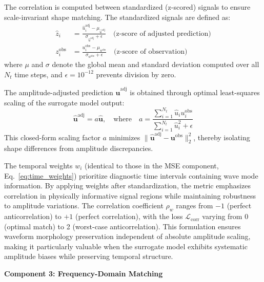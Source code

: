 \documentclass[12pt,a4paper]{report}
\begin{document}
The correlation is computed between standardized (z-scored) signals to ensure scale-invariant shape matching. The standardized signals are defined as:
\begin{align}
\hat{z}_i &= \frac{\hat{u}_i^{\text{adj}} - \mu_{\hat{u}^{\text{adj}}}}{\sigma_{\hat{u}^{\text{adj}}} + \epsilon} \quad \text{(z-score of adjusted prediction)} \\
z_i^{\text{obs}} &= \frac{u_i^{\text{obs}} - \mu_{u^{\text{obs}}}}{\sigma_{u^{\text{obs}}} + \epsilon} \quad \text{(z-score of observation)}
\end{align}
where $\mu$ and $\sigma$ denote the global mean and standard deviation computed over all $N_t$ time steps, and $\epsilon = 10^{-12}$ prevents division by zero.

The amplitude-adjusted prediction $\hat{\mathbf{u}}^{\text{adj}}$ is obtained through optimal least-squares scaling of the surrogate model output:
\begin{equation}
\hat{\mathbf{u}}^{\text{adj}} = a \hat{\mathbf{u}}, \quad \text{where} \quad a = \frac{\sum_{i=1}^{N_t} \hat{u}_i u_i^{\text{obs}}}{\sum_{i=1}^{N_t} \hat{u}_i^2 + \epsilon}
\label{eq:amplitude_adjustment}
\end{equation}
This closed-form scaling factor $a$ minimizes $\|\hat{\mathbf{u}}^{\text{adj}} - \mathbf{u}^{\text{obs}}\|_2^2$, thereby isolating shape differences from amplitude discrepancies.

The temporal weights $w_i$ (identical to those in the MSE component, Eq.~\ref{eq:time_weights}) prioritize diagnostic time intervals containing wave mode information. By applying weights after standardization, the metric emphasizes correlation in physically informative signal regions while maintaining robustness to amplitude variations. The correlation coefficient $\rho_w$ ranges from $-1$ (perfect anticorrelation) to $+1$ (perfect correlation), with the loss $\mathcal{L}_{\text{corr}}$ varying from 0 (optimal match) to 2 (worst-case anticorrelation). This formulation ensures waveform morphology preservation independent of absolute amplitude scaling, making it particularly valuable when the surrogate model exhibits systematic amplitude biases while preserving temporal structure.



\textbf{Component 3: Frequency-Domain Matching}
\end{document}
